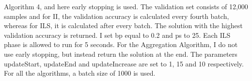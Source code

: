\begin{center}
\begin{table}[H]
{{{            Algorithm 4, and here early stopping is used. The validation set consists of 12,000 samples and for
            II, the validation accuracy is calculated every fourth batch, whereas for ILS, it is calculated after every batch.
            The solution with the highest validation accuracy is returned. I set bp equal to 0.2 and ps to 25.
            Each ILS phase is allowed to run for 5 seconds. 
            For the Aggregation Algorithm, I do not use early stopping, but instead return the solution at the end. The parameters
            updateStart, updateEnd and updateIncrease are set to 1, 15 and 10 respectively. For all the algorithms,
            a batch size of 1000 is used.}}} 
\label{MBT}
\end{table}

\end{center}
